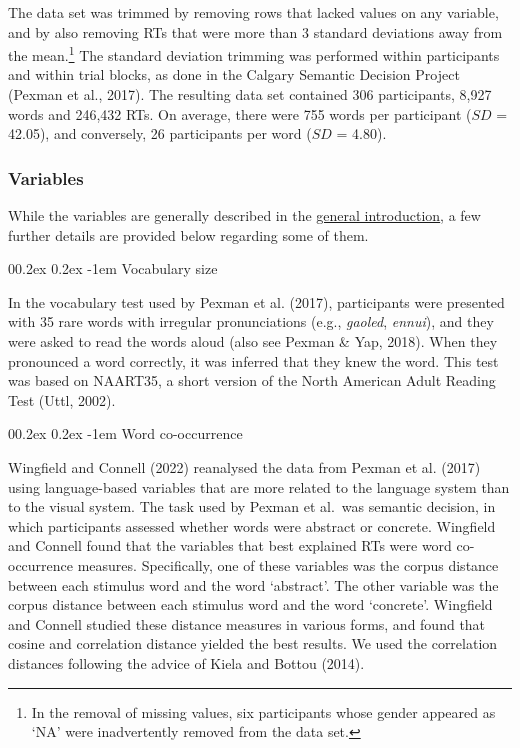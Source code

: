 \documentclass[
  12pt,
  man,floatsintext]{apa7}
\makeatletter
\let\oldparagraph\paragraph
\renewcommand{\paragraph}[1]{\oldparagraph{#1}\mbox{}}
\renewcommand{\paragraph}{\@startsection{paragraph}{4}{\parindent}%
  {0\baselineskip \@plus 0.2ex \@minus 0.2ex}%
  {-1em}%
  {\normalfont\normalsize\bfseries\itshape\typesectitle}}
\makeatother
\begin{document}
The data set was trimmed by removing rows that lacked values on any variable, and by also removing RTs that were more than 3 standard deviations away from the mean.\footnote{In the removal of missing values, six participants whose gender appeared as `NA' were inadvertently removed from the data set.} The standard deviation trimming was performed within participants and within trial blocks, as done in the Calgary Semantic Decision Project (Pexman et al., 2017). The resulting data set contained 306 participants, 8,927 words and 246,432 RTs. On average, there were 755 words per participant (\(SD\) = 42.05), and conversely, 26 participants per word (\(SD\) = 4.80).

\hypertarget{variables-1}{%
\subsubsection{Variables}\label{variables-1}}

While the variables are generally described in the \protect\hyperlink{present-studies}{\underline{general introduction}}, a few further details are provided below regarding some of them.

\hypertarget{vocabulary-size}{%
\paragraph{Vocabulary size}\label{vocabulary-size}}

In the vocabulary test used by Pexman et al. (2017), participants were presented with 35 rare words with irregular pronunciations (e.g., \emph{gaoled}, \emph{ennui}), and they were asked to read the words aloud (also see Pexman \& Yap, 2018). When they pronounced a word correctly, it was inferred that they knew the word. This test was based on NAART35, a short version of the North American Adult Reading Test (Uttl, 2002).

\hypertarget{word-co-occurrence}{%
\paragraph{Word co-occurrence}\label{word-co-occurrence}}

Wingfield and Connell (2022) reanalysed the data from Pexman et al. (2017) using language-based variables that are more related to the language system than to the visual system. The task used by Pexman et al.~was semantic decision, in which participants assessed whether words were abstract or concrete. Wingfield and Connell found that the variables that best explained RTs were word co-occurrence measures. Specifically, one of these variables was the corpus distance between each stimulus word and the word `abstract'. The other variable was the corpus distance between each stimulus word and the word `concrete'. Wingfield and Connell studied these distance measures in various forms, and found that cosine and correlation distance yielded the best results. We used the correlation distances following the advice of Kiela and Bottou (2014).
\end{document}
